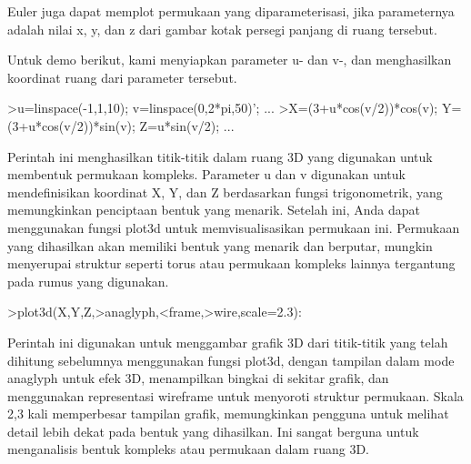 \documentclass{article}
\begin{document}
\begin{eulernotebook}
\begin{eulercomment}
\begin{eulercomment}
\begin{eulercomment}
\begin{eulercomment}
\begin{eulercomment}
\begin{eulercomment}
\begin{eulercomment}
Euler juga dapat memplot permukaan yang diparameterisasi, jika
parameternya adalah nilai x, y, dan z dari gambar kotak persegi
panjang di ruang tersebut.

Untuk demo berikut, kami menyiapkan parameter u- dan v-, dan
menghasilkan koordinat ruang dari parameter tersebut.
\end{eulercomment}
\begin{eulerprompt}
>u=linspace(-1,1,10); v=linspace(0,2*pi,50)'; ...
>X=(3+u*cos(v/2))*cos(v); Y=(3+u*cos(v/2))*sin(v); Z=u*sin(v/2); ...
\end{eulerprompt}
\begin{eulercomment}
Perintah ini menghasilkan titik-titik dalam ruang 3D yang digunakan
untuk membentuk permukaan kompleks. Parameter u dan v digunakan untuk
mendefinisikan koordinat X, Y, dan Z berdasarkan fungsi trigonometrik,
yang memungkinkan penciptaan bentuk yang menarik. Setelah ini, Anda
dapat menggunakan fungsi plot3d untuk memvisualisasikan permukaan ini.
Permukaan yang dihasilkan akan memiliki bentuk yang menarik dan
berputar, mungkin menyerupai struktur seperti torus atau permukaan
kompleks lainnya tergantung pada rumus yang digunakan.
\end{eulercomment}
\begin{eulerprompt}
>plot3d(X,Y,Z,>anaglyph,<frame,>wire,scale=2.3):
\end{eulerprompt}
\begin{eulercomment}
Perintah ini digunakan untuk menggambar grafik 3D dari titik-titik
yang telah dihitung sebelumnya menggunakan fungsi plot3d, dengan
tampilan dalam mode anaglyph untuk efek 3D, menampilkan bingkai di
sekitar grafik, dan menggunakan representasi wireframe untuk menyoroti
struktur permukaan. Skala 2,3 kali memperbesar tampilan grafik,
memungkinkan pengguna untuk melihat detail lebih dekat pada bentuk
yang dihasilkan. Ini sangat berguna untuk menganalisis bentuk kompleks
atau permukaan dalam ruang 3D.


\end{eulercomment}
\end{eulercomment}
\end{eulercomment}
\end{eulercomment}
\end{eulercomment}
\end{eulercomment}
\end{eulercomment}
\end{eulernotebook}
\end{document}
